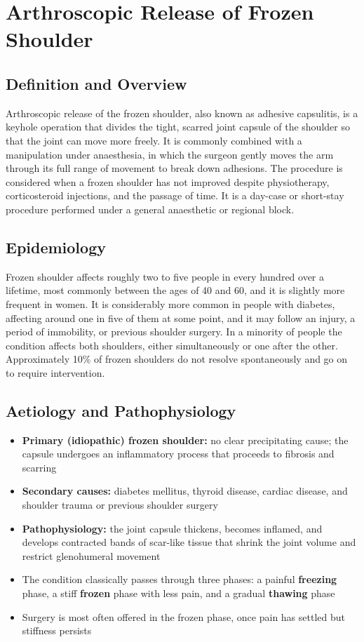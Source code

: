 \chapter{Arthroscopic Release of Frozen Shoulder}

\section*{Definition and Overview}
Arthroscopic release of the frozen shoulder, also known as adhesive capsulitis, is a keyhole operation that divides the tight, scarred joint capsule of the shoulder so that the joint can move more freely. It is commonly combined with a manipulation under anaesthesia, in which the surgeon gently moves the arm through its full range of movement to break down adhesions. The procedure is considered when a frozen shoulder has not improved despite physiotherapy, corticosteroid injections, and the passage of time. It is a day-case or short-stay procedure performed under a general anaesthetic or regional block.

\section*{Epidemiology}
Frozen shoulder affects roughly two to five people in every hundred over a lifetime, most commonly between the ages of 40 and 60, and it is slightly more frequent in women. It is considerably more common in people with diabetes, affecting around one in five of them at some point, and it may follow an injury, a period of immobility, or previous shoulder surgery. In a minority of people the condition affects both shoulders, either simultaneously or one after the other. Approximately 10\% of frozen shoulders do not resolve spontaneously and go on to require intervention.

\section*{Aetiology and Pathophysiology}
\begin{itemize}
    \item \textbf{Primary (idiopathic) frozen shoulder:} no clear precipitating cause; the capsule undergoes an inflammatory process that proceeds to fibrosis and scarring
    \item \textbf{Secondary causes:} diabetes mellitus, thyroid disease, cardiac disease, and shoulder trauma or previous shoulder surgery
    \item \textbf{Pathophysiology:} the joint capsule thickens, becomes inflamed, and develops contracted bands of scar-like tissue that shrink the joint volume and restrict glenohumeral movement
    \item The condition classically passes through three phases: a painful \textbf{freezing} phase, a stiff \textbf{frozen} phase with less pain, and a gradual \textbf{thawing} phase
    \item Surgery is most often offered in the frozen phase, once pain has settled but stiffness persists
\end{itemize}

